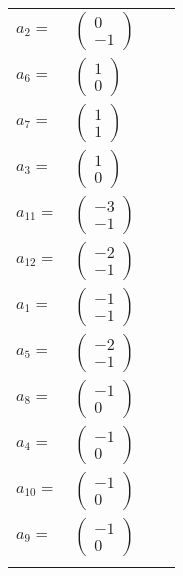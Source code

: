 \documentclass[1p]{elsarticle_modified}
\theoremstyle{definition}
\begin{document}
\begin{tabular}{m{7pt} m{180pt} m{7pt} m{180pt} }
\flushright $a_{2}=$&$\begin{pmatrix}0\\-1\end{pmatrix}$ \\
\flushright $a_{6}=$&$\begin{pmatrix}1\\0\end{pmatrix}$ \\
\flushright $a_{7}=$&$\begin{pmatrix}1\\1\end{pmatrix}$ \\
\flushright $a_{3}=$&$\begin{pmatrix}1\\0\end{pmatrix}$ \\
\flushright $a_{11}=$&$\begin{pmatrix}-3\\-1\end{pmatrix}$ \\
\flushright $a_{12}=$&$\begin{pmatrix}-2\\-1\end{pmatrix}$ \\
\flushright $a_{1}=$&$\begin{pmatrix}-1\\-1\end{pmatrix}$ \\
\flushright $a_{5}=$&$\begin{pmatrix}-2\\-1\end{pmatrix}$ \\
\flushright $a_{8}=$&$\begin{pmatrix}-1\\0\end{pmatrix}$ \\
\flushright $a_{4}=$&$\begin{pmatrix}-1\\0\end{pmatrix}$ \\
\flushright $a_{10}=$&$\begin{pmatrix}-1\\0\end{pmatrix}$ \\
\flushright $a_{9}=$&$\begin{pmatrix}-1\\0\end{pmatrix}$\\&\end{tabular}
\end{document}
